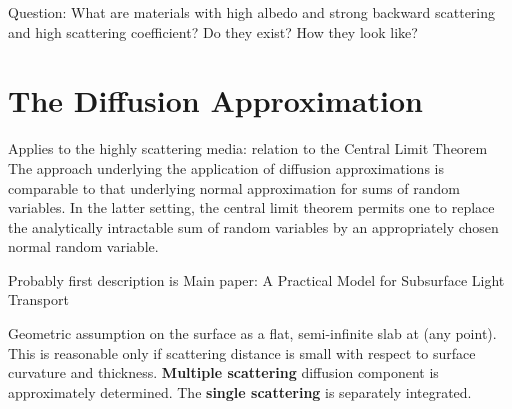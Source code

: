 Question: What are materials with high albedo and strong backward scattering
and high scattering coefficient? Do they exist? How they look like?

\section{The Diffusion Approximation}
Applies to the highly scattering media: relation to the Central Limit Theorem
The approach underlying the application of diffusion approximations is comparable to that underlying normal approximation for
sums of random variables. In the latter setting, the central limit theorem
permits one to replace the analytically intractable sum of random variables by
an appropriately chosen normal random variable.

Probably first description is \cite{Stam1995}
Main paper: A Practical Model for Subsurface Light Transport \cite{Jensen:2001:PMS:383259.383319}

Geometric assumption on the surface as a flat, semi-infinite slab at (any
point). This is reasonable only if scattering distance is small with respect to
surface curvature and thickness. \textbf{Multiple scattering} diffusion
component is approximately determined. The \textbf{single scattering} is
separately integrated.
